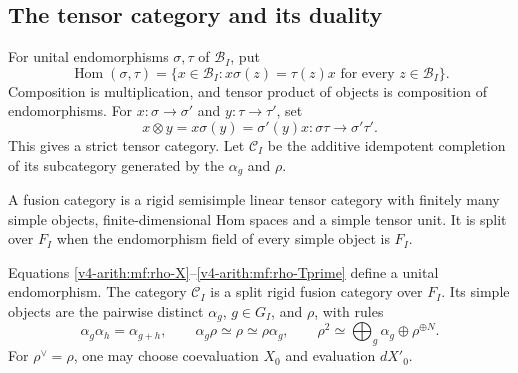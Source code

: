 \subsection{The tensor category and its duality}

For unital endomorphisms \(\sigma,\tau\) of \(\mathcal B_I\), put
\[
 \operatorname{Hom}(\sigma,\tau)=
 \{x\in\mathcal B_I:
       x\sigma(z)=\tau(z)x\text{ for every }z\in\mathcal B_I\}.
\]
Composition is multiplication, and tensor product of objects is
composition of endomorphisms. For
\(x:\sigma\to\sigma'\) and \(y:\tau\to\tau'\), set
\begin{equation}\label{v4-arith:mf:tensor-map}
 x\otimes y=x\sigma(y)=\sigma'(y)x:
                \sigma\tau\longrightarrow\sigma'\tau'.
\end{equation}
This gives a strict tensor category.
Let \(\mathcal C_I\) be the additive idempotent completion of its
subcategory generated by the \(\alpha_g\) and \(\rho\).

A fusion category is a rigid semisimple linear tensor category
with finitely many simple objects, finite-dimensional Hom spaces
and a simple tensor unit. It is split over \(F_I\) when the
endomorphism field of every simple object is \(F_I\).

\begin{theorem}\label{v4-arith:mf:fusion}
Equations \eqref{v4-arith:mf:rho-X}--\eqref{v4-arith:mf:rho-Tprime}
define a unital endomorphism.
The category \(\mathcal C_I\) is a split rigid fusion category
over \(F_I\).
Its simple objects are the pairwise distinct
\(\alpha_g\), \(g\in G_I\), and \(\rho\), with rules
\begin{equation}\label{v4-arith:mf:fusion-rule}
 \alpha_g\alpha_h=\alpha_{g+h},\qquad
 \alpha_g\rho\simeq\rho\simeq\rho\alpha_g,\qquad
 \rho^2\simeq\bigoplus_g\alpha_g\oplus\rho^{\oplus N}.
\end{equation}
For \(\rho^\vee=\rho\), one may choose coevaluation \(X_0\)
and evaluation \(dX'_0\).
\end{theorem}

